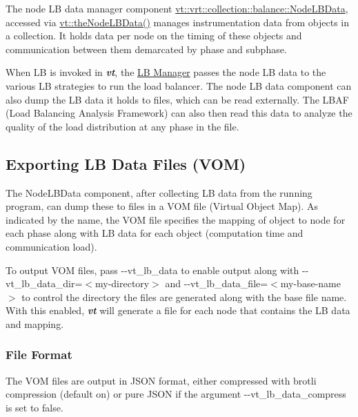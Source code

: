 The node LB data manager component {\ttfamily \hyperlink{structvt_1_1vrt_1_1collection_1_1balance_1_1_node_l_b_data}{vt\+::vrt\+::collection\+::balance\+::\+Node\+L\+B\+Data}}, accessed via {\ttfamily \hyperlink{namespacevt_af2ddfbdc455e98a0d46732522d8cf589}{vt\+::the\+Node\+L\+B\+Data()}} manages instrumentation data from objects in a collection. It holds data per node on the timing of these objects and communication between them demarcated by phase and subphase.

When LB is invoked in {\bfseries {\itshape vt}}, the \hyperlink{lb-manager}{LB Manager} passes the node LB data to the various LB strategies to run the load balancer. The node LB data component can also dump the LB data it holds to files, which can be read externally. The L\+B\+AF (Load Balancing Analysis Framework) can also then read this data to analyze the quality of the load distribution at any phase in the file.\hypertarget{node-lb-data_export-lb-data-file}{}\subsection{Exporting L\+B Data Files (\+V\+O\+M)}\label{node-lb-data_export-lb-data-file}
The {\ttfamily Node\+L\+B\+Data} component, after collecting LB data from the running program, can dump these to files in a V\+OM file (Virtual Object Map). As indicated by the name, the V\+OM file specifies the mapping of object to node for each phase along with LB data for each object (computation time and communication load).

To output V\+OM files, pass {\ttfamily -\/-\/vt\+\_\+lb\+\_\+data} to enable output along with {\ttfamily -\/-\/vt\+\_\+lb\+\_\+data\+\_\+dir=$<$my-\/directory$>$} and {\ttfamily -\/-\/vt\+\_\+lb\+\_\+data\+\_\+file=$<$my-\/base-\/name$>$} to control the directory the files are generated along with the base file name. With this enabled, {\bfseries {\itshape vt}} will generate a file for each node that contains the LB data and mapping.\hypertarget{node-lb-data_lb-data-file-format}{}\subsubsection{File Format}\label{node-lb-data_lb-data-file-format}
The V\+OM files are output in J\+S\+ON format, either compressed with brotli compression (default on) or pure J\+S\+ON if the argument {\ttfamily -\/-\/vt\+\_\+lb\+\_\+data\+\_\+compress} is set to {\ttfamily false}.

